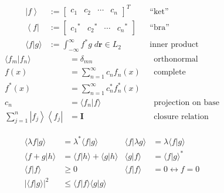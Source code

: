 \noindent\begin{align*}
    \left|f\right\rangle  & := \begin{bmatrix}
                                   c_1 & c_2 & \cdots & c_n
                               \end{bmatrix}^T                               &  & \text{``ket''}              \\
    \left\langle f\right| & := \begin{bmatrix}
                                   {c_1}^* & {c_2}^* & \cdots & {c_n}^*
                               \end{bmatrix}                   &  & \text{``bra''}                            \\
    \langle f|g \rangle   & := \int_{-\infty}^{\infty} f^* g\; d \mathbf{r} \in L_2 &  & \text{inner product}
\end{align*}
\noindent\begin{align*}
    \langle f_m|f_n \rangle                                       & = \delta_{mn}                        &  & \text{orthonormal}        \\
    f(x)                                                          & = \sum_{n=1}^{\infty} c_n f_n(x)     &  & \text{complete}           \\
    f^*(x)                                                        & = \sum_{n=1}^{\infty} c_n^* f_n^*(x) &  &                           \\
    c_n                                                           & = \langle f_n|f \rangle              &  & \text{projection on base} \\
    \sum_{j=1}^{n} \left|f_j\right\rangle \left\langle f_j\right| & = \mathbf{I}                         &  & \text{closure relation}
\end{align*}

\newcol{}
\noindent\begin{align*}
    \langle \lambda f|g \rangle & =\lambda^* \langle f|g \rangle               & \langle f|\lambda g \rangle & =\lambda \langle f|g \rangle \\
    \langle f+g|h \rangle       & =\langle f|h \rangle + \langle g|h \rangle   & \langle g|f \rangle         & = {\langle f|g \rangle}^*    \\
    \langle f|f \rangle         & \ge 0                                        & \langle f|f \rangle         & = 0 \leftrightarrow f=0      \\
    |\langle f|g \rangle |^2    & \leq \langle f|f \rangle \langle g|g \rangle
\end{align*}

